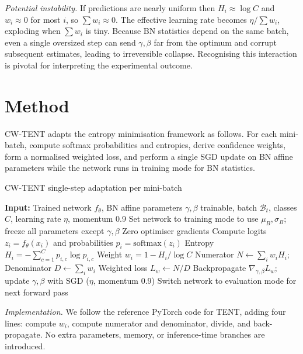 \documentclass{article} %
\begin{document}
\textit{Potential instability.} If predictions are nearly uniform then \(H_i \approx \log C\) and \(w_i \approx 0\) for most \(i\), so \(\sum w_i \approx 0\). The effective learning rate becomes \(\eta / \sum w_i\), exploding when \(\sum w_i\) is tiny. Because BN statistics depend on the same batch, even a single oversized step can send \(\gamma, \beta\) far from the optimum and corrupt subsequent estimates, leading to irreversible collapse. Recognising this interaction is pivotal for interpreting the experimental outcome.

\section{Method}
\label{sec:method}
CW-TENT adapts the entropy minimisation framework as follows. For each mini-batch, compute softmax probabilities and entropies, derive confidence weights, form a normalised weighted loss, and perform a single SGD update on BN affine parameters while the network runs in training mode for BN statistics.

\begin{algorithm}
\caption{CW-TENT single-step adaptation per mini-batch}
\begin{algorithmic}[1]
\State\textbf{Input:} Trained network \(f_{\theta}\), BN affine parameters \(\gamma, \beta\) trainable, batch \(\mathcal{B}_t\), classes \(C\), learning rate \(\eta\), momentum 0.9
\State Set network to training mode to use \(\mu_{B}, \sigma_{B}\); freeze all parameters except \(\gamma, \beta\)
\State Zero optimiser gradients
  \State Compute logits \(z_i = f_{\theta}(x_i)\) and probabilities \(p_i = \mathrm{softmax}(z_i)\)
  \State Entropy \(H_i = -\sum_{c=1}^{C} p_{i,c} \log p_{i,c}\)
  \State Weight \(w_i = 1 - H_i / \log C\)
\EndFor
\State Numerator \(N \leftarrow \sum_{i} w_i H_i\); Denominator \(D \leftarrow \sum_{i} w_i\)
\State Weighted loss \(L_{w} \leftarrow N / D\)
\State Backpropagate \(\nabla_{\gamma,\beta} L_{w}\); update \(\gamma, \beta\) with SGD (\(\eta\), momentum 0.9)
\State Switch network to evaluation mode for next forward pass
\end{algorithmic}
\end{algorithm}

\textit{Implementation.} We follow the reference PyTorch code for TENT, adding four lines: compute \(w_i\), compute numerator and denominator, divide, and back-propagate. No extra parameters, memory, or inference-time branches are introduced.
\end{document}
